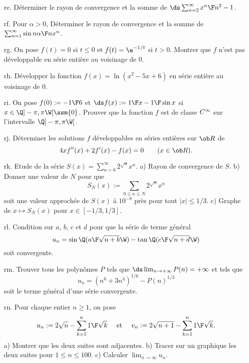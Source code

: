 \exo [Level=2,Fight=0,Learn=0,Type=\Exercices,Field=\SériesEntières,Origin=] re. 
Déterminer le rayon de convergence 
et la somme de $\ds\sum_{n=2}^\infty{x^n\F n^2-1}$. 

\exo [Level=2,Fight=0,Learn=0,Type=\Exercices,Field=\SériesEntières,Origin=] rf. 
Pour $\alpha>0$, Déterminer le rayon de convergence et la somme de 
$\sum_{n=1}^\infty{\sin n\alpha\F n}x^n$. 

\exo [Level=2,Fight=0,Learn=0,Type=\Exercices,Field=\SériesEntières,Origin=] rg. 
On pose $f(t)=0$ si $t\le 0$ et $f(t)=\e^{-1/t}$ si $t>0$. 
Montrer que $f$ n'est pas développable en série entière au voisinage de $0$. 

\exo [Level=2,Fight=0,Learn=0,Type=\Exercices,Field=\SériesEntières,Origin=] rh. 
Développer la fonction $f(x)=\ln(x^2-5x+6)$ en série entière au voisinage de $0$. 

\exo [Level=2,Fight=0,Learn=0,Type=\Exercices,Field=\SériesEntières,Origin=] ri. 
On pose $f(0):=-{1\F6}$ et $\ds f(x):={1\F x}-{1\F\sin x}$ si $x\in\Q]-\pi,\pi\W[\ssm\{0\}$. 
Prouver que la fonction $f$ est de classe $\sc C^\infty$ sur l'intervalle $\Q]-\pi,\pi\W[$. 

\exo [Level=2,Fight=0,Learn=0,Type=\Exercices,Field=\SériesEntières,Origin=] rj. 
Déterminer les solutions $f$ développables en séries entières sur $\ob R$ de 
$$
4xf''(x)+2f'(x)-f(x)=0\qquad(x\in\ob R).
$$

\exo [Level=2,Fight=0,Learn=0,Type=\Exercices,Field=\SériesEntières,Origin=] rk. 
Etude de la série $S(x)=\sum_{n=0}^\infty2^{\sqrt n}x^n$. \pn
a) Rayon de convergence de $S$. \pn
b) Donner une valeur de $N$ pour que 
$$
S_N(x):=\sum_{0\le n\le N}2^{\sqrt n}x^n
$$ 
soit une valeur approchée de $S(x)$ à $10^{-8}$ près 
pour tout $|x|\le1/3$. \pn
c) Graphe de $x\mapsto S_N(x)$ pour $x\in[-1/3,1/3]$. 

\exo [Level=2,Fight=0,Learn=0,Type=\Maple,Field=\SériesEntières,Origin=] rl. 
Condition sur $a$, $b$, $c$ et $d$ pour que la série de terme général 
$$
u_n=\sin\Q({a\F\sqrt{n+b}}\W)-\tan\Q({c\F\sqrt{n+d}}\W)
$$
soit convergente. 

\exo [Level=2,Fight=0,Learn=0,Type=\Maple,Field=\SériesEntières,Origin=] rm. 
Trouver tous les polynômes $P$ tels que $\ds\lim_{n\to+\infty}P(n)=+\infty$ et 
tels que 
$$
u_n=(n^6+3n^4)^{1/6}-P(n)^{1/3}
$$
soit le terme général d'une série convergente. 

\exo [Level=1,Fight=0,Learn=0,Type=\Maple,Field=\Suites,Origin=] rn. 
Pour chaque entier $n\ge1$, on pose 
$$
u_n:=2\sqrt n-\sum_{k=1}^n{1\F\sqrt k}\quad\hbox{ et }\quad v_n:=2\sqrt{n+1}-\sum_{k=1}^n{1\F\sqrt k}. 
$$
a) Montrer que les deux suites sont adjacentes. \pn
b) Tracer sur un graphique les deux suites pour $1\le n\le 100$. \pn
c) Calculer $\lim_{n\to\infty} u_n$. 

